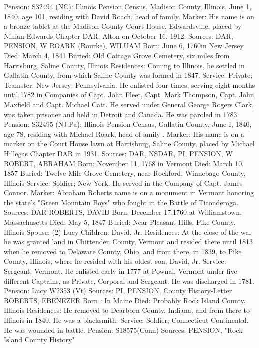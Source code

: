 Pension: S32494 (NC); Illinois Pension Census, Madison County, Illinois, June 1, 1840, age 101, residing with David Roach, head of family. 
Marker: His name is on a bronze tablet at the Madison County Court House, Edwardsville, placed by Ninian Edwards Chapter DAR, Alton on October 16, 1912. 
Sources: DAR, PENSION, W 
ROARK (Rourke), WILUAM
Born: June 6, 1760in New Jersey
Died: March 4, 1841
Buried: Old Cottage Grove Cemetery, six miles from Harrisburg, Saline County, Illinois
Residences: Coming to Illinois, he settled in Gallatin County, from which Saline County was formed in 1847. 
Service: Private; Teamster: New Jersey: Pennsylvania. He enlisted four times, serving eight months until 1782 in Companies of Capt. John Fleet, Capt. Mark Thompson, Capt. John Maxfield and Capt. Michael Catt. He served under General George Rogers Clark, was taken prisoner and held in Detroit and Canada. He was paroled in 1783. 
Pension: S32495 (NJ:Pa); Illinois Pension Census, Gallatin County, June I, 1840, age 78, residing with Michael Roark, head of amily . 
Marker: His name is on a marker on the Court House lawn at Harrisburg, Saline County, placed by Michael Hillegas Chapter DAR in 1931. 
Sources: DAR, NSDAR, PI, PENSION, W 
ROBERT, ABRAHAM 
Born: November 11, 1768 in Vermont 
Died: March 10, 1857 
Buried: Twelve Mile Grove Cemetery, near Rockford, Winnebago County, Illinois 
Service: Soldier; New York. He served in the Company of Capt. James Connor. 
Marker: Abraham Roberts name is on a monument in Vermont honoring the state's "Green Mountain Boys" who fought in the Battle of Ticonderoga.
Sources: DAR 
ROBERTS, DAVID
Born: December 17,1760 at Williamstown, Massachusetts 
Died: May 5, 1847 
Buried: Near Pleasant Hills, Pike County, Illinois 
Spouse: (2) Lucy 
Children: David, Jr. 
Residences: At the close of the war he was granted land in Chittenden County, Vermont and resided there until 1813 when he removed to Delaware County, Ohio, and from there, in 1839, to Pike County, Illinois, where he resided with his oldest son, David, Jr. 
Service: Sergeant; Vermont. He enlisted early in 1777 at Pownal, Vermont under five different Captains, as Private, Corporal and Sergeant. He was discharged in 1781. 
Pension: Lucy W2353 (Vt) 
Sources: PI, PENSION, County History-Letter 
ROBERTS, EBENEZER 
Born : In Maine
Died: Probably Rock Island County, Illinois
Residences: He removed to Dearborn County, Indiana, and from there to Illinois in 1840. He was a blacksmith.
Service: Soldier; Connecticut Continental. He was wounded in battle. 
Pension: S18575(Conn)
Sources: PENSION, "Rock Island County History" 
